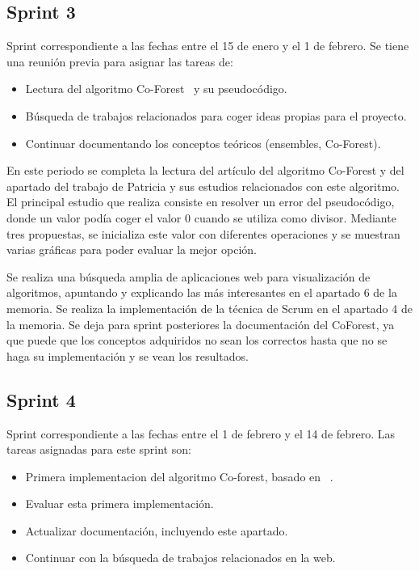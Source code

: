 \subsection{Sprint 3}
Sprint correspondiente a las fechas entre el 15 de enero y el 1 de febrero. Se tiene una reunión previa para asignar las tareas de: 
\begin{itemize}
	\item Lectura del algoritmo Co-Forest~\cite{IEEE:CoForest} y su pseudocódigo.
	\item Búsqueda de trabajos relacionados para coger ideas propias para el proyecto.
	\item Continuar documentando los conceptos teóricos (ensembles, Co-Forest).
\end{itemize}

En este periodo se completa la lectura del artículo del algoritmo Co-Forest y del apartado del trabajo de Patricia y sus estudios relacionados con este algoritmo. El principal estudio que realiza consiste en resolver un error del pseudocódigo, donde un valor podía coger el valor 0 cuando se utiliza como divisor. Mediante tres propuestas, se inicializa este valor con diferentes operaciones y se muestran varias gráficas para poder evaluar la mejor opción.

Se realiza una búsqueda amplia de aplicaciones web para visualización de algoritmos, apuntando y explicando las más interesantes en el apartado 6 de la memoria.
Se realiza la implementación de la técnica de Scrum en el apartado 4 de la memoria.
Se deja para sprint posteriores la documentación del CoForest, ya que puede que los conceptos adquiridos no sean los correctos hasta que no se haga su implementación y se vean los resultados.

\subsection{Sprint 4}
Sprint correspondiente a las fechas entre el 1 de febrero y el 14 de febrero. Las tareas asignadas para este sprint son:
\begin{itemize}
	\item Primera implementacion del algoritmo Co-forest, basado en ~\cite{IEEE:CoForest}.
	\item Evaluar esta primera implementación.
	\item Actualizar documentación, incluyendo este apartado.
	\item Continuar con la búsqueda de trabajos relacionados en la web.
\end{itemize}

